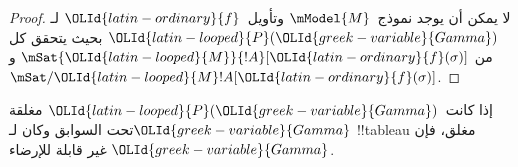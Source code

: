 \documentclass[../../../include/open-logic-section]{subfiles}
\begin{document}
\begin{proof}
  لا يمكن أن يوجد نموذج~$\mModel{M}$ وتأويل~$\OLId{latin-ordinary}{f}$ لـ$\OLId{latin-looped}{P}(\OLId{greek-variable}{Gamma})$ بحيث
  يتحقق كل من $\mSat{\OLId{latin-looped}{M}}{!A}[\OLId{latin-ordinary}{f}(\sigma)]$ و
  $\mSat/{\OLId{latin-looped}{M}}{!A}[\OLId{latin-ordinary}{f}(\sigma)]$.
\end{proof}

\begin{thm}[السلامة]
  إذا كانت~$\OLId{latin-looped}{P}(\OLId{greek-variable}{Gamma})$ مغلقة تحت السوابق وكان لـ$\OLId{greek-variable}{Gamma}$ !!{tableau}
  مغلق، فإن $\OLId{greek-variable}{Gamma}$ غير قابلة للإرضاء.
\end{thm}
\end{document}
